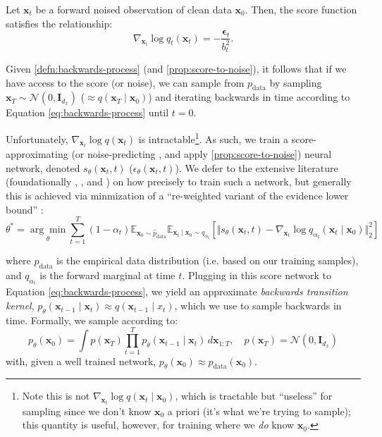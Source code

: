 \begin{proposition} \label{prop:score-to-noise}
    Let $\mathbf{x}_t$ be a forward noised observation of clean data $\mathbf{x}_0$. Then, the score
    function satisfies the relationship:
    $$
    \nabla_{\mathbf{x}_t} \log q_t(\mathbf{x}_t) = -\frac{\mathbf{\epsilon}_t}{b_t^2}.
    $$
\end{proposition}

Given \ref{defn:backwards-process} (and \ref{prop:score-to-noise}), it follows that if we have
access to the score (or noise), we can sample from $p_{\text{data}}$ by sampling
$\mathbf{x}_T \sim \mathcal{N}(0, \mathbf{I}_{d_x})$ ($\approx q(\mathbf{x}_T \mid \mathbf{x}_0)$)
and iterating backwards in time according to Equation \ref{eq:backwards-process} until $t=0$.

Unfortunately, $\nabla_{\mathbf{x}_t}\log q(\mathbf{x}_t)$ is intractable\footnote{Note this is not
$\nabla_{\mathbf{x}_t}\log q(\mathbf{x}_t \mid \mathbf{x}_0)$, which is tractable but ``useless''
for sampling since we don't know $\mathbf{x}_0$ a priori (it's what we're trying to sample); this
quantity is useful, however, for training where we \emph{do} know $\mathbf{x}_0$.}.
As such, we train a score-approximating \parencite{songScoreBasedGenerativeModeling2021} (or
noise-predicting \parencite{hoDenoisingDiffusionProbabilistic2020}, and apply
\ref{prop:score-to-noise}) neural network, denoted $s_\theta(\mathbf{x}_t, t)$
($\epsilon_\theta(\mathbf{x}_t, t)$). We defer to the extensive literature (foundationally
\textcite{hoDenoisingDiffusionProbabilistic2020}, \textcite{songGenerativeModelingEstimating2020},
\textcite{songScoreBasedGenerativeModeling2021} and \textcite{nicholImprovedDenoisingDiffusion2021})
on how precisely to train such a network, but generally this is achieved via minmization of a
``re-weighted variant of the evidence lower bound''
\parencite{songScoreBasedGenerativeModeling2021}:
\begin{equation*}
    \theta^* = \underset{\theta}{\arg\min}\sum_{t=1}^T (1 - \alpha_t)\mathbb{E}_{\mathbf{x}_0 \sim \hat{p}_{\text{data}}}\mathbb{E}_{\mathbf{x}_t \mid \mathbf{x}_0 \sim q_{\alpha_t}}\left[\Vert s_\theta(\mathbf{x}_t, t) - \nabla_{\mathbf{x}_t}\log q_{\alpha_t}(\mathbf{x}_t \mid \mathbf{x}_0)\Vert_2^2\right]
\end{equation*}

where $\hat{p}_{\text{data}}$ is the empirical data distribution (i.e. based on our training
samples), and $q_{\alpha_t}$ is the forward marginal at time $t$. Plugging in this score network to
Equation \ref{eq:backwards-process}, we yield an approximate \emph{backwards transition kernel},
$p_\theta(\mathbf{x}_{t-1} \mid \mathbf{x}_t) \approx q(\mathbf{x}_{t-1} \mid x_t)$, which we use to
sample backwards in time. Formally, we sample according to:
\begin{equation}
    p_\theta(\mathbf{x}_0) = \int p(\mathbf{x}_T)\prod_{t=1}^T p_\theta(\mathbf{x}_{t-1} \mid \mathbf{x}_{t})\, d\mathbf{x}_{1:T},\quad p(\mathbf{x}_T) = \mathcal{N}(0, \mathbf{I}_{d_x})
\end{equation}
with, given a well trained network, $p_\theta(\mathbf{x}_0) \approx p_{\text{data}}(\mathbf{x}_0)$.

